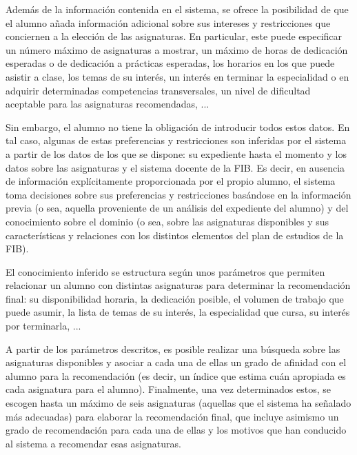 Además de la información contenida en el sistema, se ofrece la posibilidad de 
que el alumno añada información adicional sobre sus intereses y restricciones 
que conciernen a la elección de las asignaturas. En particular, este puede 
especificar un número máximo de asignaturas a mostrar, un máximo de horas de 
dedicación esperadas o de dedicación a prácticas esperadas, los horarios en 
los que puede asistir a clase, los temas de su interés, un interés en terminar 
la especialidad o en adquirir determinadas competencias transversales, un 
nivel de dificultad aceptable para las asignaturas recomendadas, ...

Sin embargo, el alumno no tiene la obligación de introducir todos estos datos. 
En tal caso, algunas de estas preferencias y restricciones son inferidas por 
el sistema a partir de los datos de los que se dispone: su expediente hasta 
el momento y los datos sobre las asignaturas y el sistema docente de la FIB. 
Es decir, en ausencia de información explícitamente proporcionada por el
propio alumno, el sistema toma decisiones sobre sus preferencias y 
restricciones basándose en la información previa (o sea, aquella proveniente 
de un análisis del expediente del alumno) y del conocimiento sobre el dominio 
(o sea, sobre las asignaturas disponibles y sus características y relaciones 
con los distintos elementos del plan de estudios de la FIB).

El conocimiento inferido se estructura según unos parámetros que permiten 
relacionar un alumno con distintas asignaturas para determinar la 
recomendación final: su disponibilidad horaria, la dedicación posible, el 
volumen de trabajo que puede asumir, la lista de temas de su interés, la 
especialidad que cursa, su interés por terminarla, ...

A partir de los parámetros descritos, es posible realizar una búsqueda sobre 
las asignaturas disponibles y asociar a cada una de ellas un grado de afinidad 
con el alumno para la recomendación (es decir, un índice que estima cuán 
apropiada es cada asignatura para el alumno). Finalmente, una vez determinados 
estos, se escogen hasta un máximo de seis asignaturas (aquellas que el sistema 
ha señalado más adecuadas) para elaborar la recomendación final, que incluye 
asimismo un grado de recomendación para cada una de ellas y los motivos que 
han conducido al sistema a recomendar esas asignaturas.


